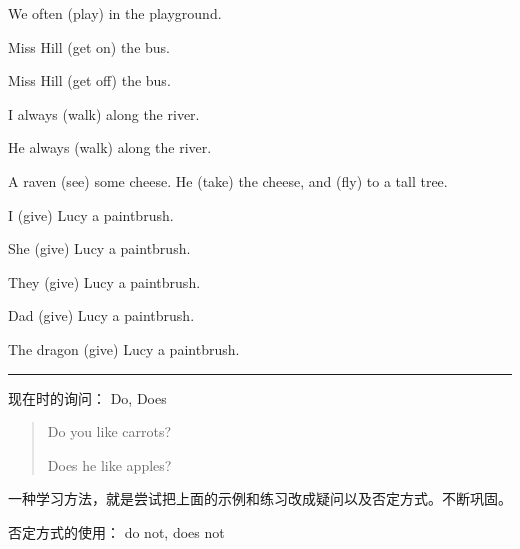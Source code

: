 \documentclass[a4paper]{article}
\newcommand{\kai}[1]{{\KAI#1}}
\newcounter{printdemonum}
\newenvironment{printdemosample}{\stepcounter{printdemonum} \tikz [baseline={([yshift=-.8ex]current bounding box.center)}]  {\kai{例句} \theprintdemonum{}} \vspace{-0.41cm} \begin{quotation}} {\end{quotation}}
\begin{document}
\begin{question}
 We often \blank[width=1.5cm]{} (play) in the playground.
\end{question}

\begin{question}
 Miss Hill \blank[width=3.0cm]{} (get on) the bus. 
 
 Miss Hill \blank[width=3.0cm]{} (get off) the bus.
\end{question}

\begin{question}
 I always \blank[width=3.0cm]{} (walk) along the river. 
 
 He always \blank[width=3.0cm]{} (walk) along the river.
\end{question}

\begin{question}
 A raven \blank[width=1.0cm]{} (see) some cheese. He \blank[width=1cm]{}(take) the cheese, and \blank[width=1cm]{}(fly) to a tall tree.
\end{question}

\begin{question}
I \blank[width=1.5cm]{} (give) Lucy a paintbrush.

She \blank[width=1.5cm]{} (give) Lucy a paintbrush. 

They \blank[width=1.5cm]{} (give) Lucy a paintbrush.

Dad \blank[width=1.5cm]{} (give) Lucy a paintbrush.

The dragon \blank[width=1.5cm]{} (give) Lucy a paintbrush.
\end{question}

\rule{\textwidth}{0.05cm}

\vspace{0.3cm}
现在时的询问： Do, Does

\begin{printdemosample}
 Do you like carrots?
 
 Does he like apples?
\end{printdemosample}

一种学习方法，就是尝试把上面的示例和练习改成疑问以及否定方式。不断巩固。


否定方式的使用： do not, does not                      
 
\end{document}
